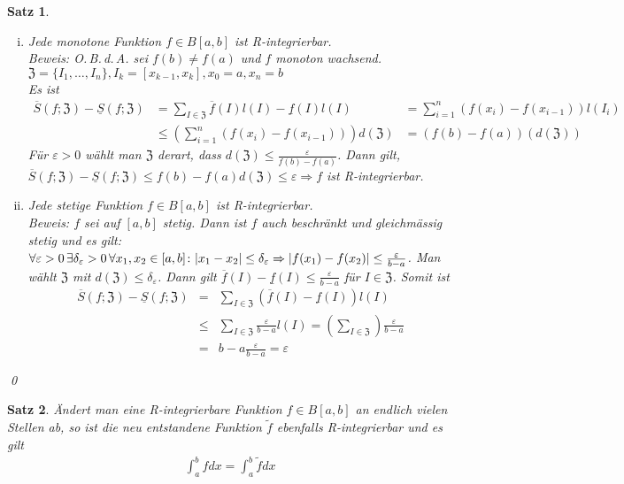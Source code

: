 \documentclass[ngerman,titlepage,twoside, parskip=half*]{scrreprt}
\newcommand*{\ZZ}{\mathfrak{Z}}
\theoremstyle{break}
\newtheorem{theorem}{Satz}[section]
\theoremstyle{nonumberbreak}
\DeclarePairedDelimiter{\abs}{\lvert}{\rvert}
\begin{document}
\begin{theorem}
  \begin{enumerate}[(i)]
    \item Jede \emph{monotone} Funktion $f\in B[a,b]$ ist R-integrierbar.\\
      \textit{Beweis}: O.\,B.\,d.\,A. sei $f(b)\neq f(a)$ und $f$ monoton wachsend.
      $\ZZ=\{I_1,\dots,I_n\}, I_k=[x_{k-1},x_k], x_0=a,x_n=b$\\
      Es ist
      \begin{align*}
        \overline{S}(f;\ZZ)-\underline{S}(f;\ZZ)&= \sum_{I\in\ZZ} \overline{f}
        (I)l(I)-\underline{f}(I)l(I)
        &= \sum_{i=1}^n (f(x_i)-f(x_{i-1}))l(I_i)\\
        &\leq \left( \sum_{i=1}^n (f(x_i)-f(x_{i-1})) \right)d(\ZZ)
        &= (f(b)-f(a))(d(\ZZ))
      \end{align*}
      Für $\varepsilon>0$ wählt man $\ZZ$ derart, dass $d(\ZZ)\leq
      \frac{\varepsilon}{f(b)-f(a)}$. Dann gilt, $\overline{S}(f;\ZZ)-
      \underline{S}(f;\ZZ)\leq f(b)-f(a)d(\ZZ)\leq \varepsilon\Rightarrow f$
      ist R-integrierbar.
    \item Jede \emph{stetige} Funktion $f\in B[a,b]$ ist R-integrierbar.\\
      \textit{Beweis}: $f$ sei auf $[a,b]$ stetig. Dann ist $f$ auch beschränkt
      und gleichmässig stetig und es gilt:
      $\forall\varepsilon>0\,\exists\delta_\varepsilon>0\,\forall x_1,x_2\in
      [a,b]\colon \abs{x_1-x_2}\leq\delta_\varepsilon\Rightarrow\abs{f(x_1)-f(x_2)}\leq
      \frac{\varepsilon}{b-a}$. Man wählt $\ZZ$ mit $d(\ZZ)\leq
      \delta_\varepsilon$. Dann gilt $\overline{f}(I)-\underline{f}(I)\leq
      \frac{\varepsilon}{b-a}$ für $I \in\ZZ$. Somit ist
      \begin{align*}
        \overline{S}(f;\ZZ)-\underline{S}(f;\ZZ)&=& \sum_{I\in\ZZ}
        (\overline{f}(I)-\underline{f}(I))l(I)\\
        &\leq& \sum_{I\in\ZZ} \frac{\varepsilon}{b-a} l(I)=\left( \sum_{I\in\ZZ}
        \right)\frac{\varepsilon}{b-a}\\
        &=& b-a\frac{\varepsilon}{b-a}=\varepsilon
      \end{align*}
  \end{enumerate}
  \qed
\end{theorem}

\begin{theorem}
  Ändert man eine R-integrierbare Funktion $f\in B[a,b]$ an endlich vielen
  Stellen ab, so ist die neu entstandene Funktion $\tilde{f}$ ebenfalls
  R-integrierbar und es gilt
  \begin{gather*}\int_a^b fdx = \int_a^b \tilde{f}dx\end{gather*}
\end{theorem}
\end{document}

